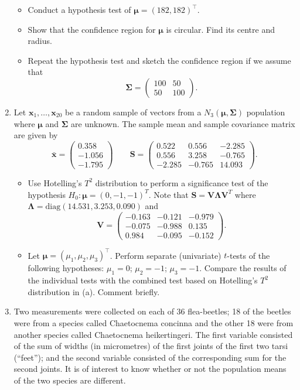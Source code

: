 \documentclass[]{book}
\providecommand{\tightlist}{%
  \setlength{\itemsep}{0pt}\setlength{\parskip}{0pt}}
\theoremstyle{definition}
\theoremstyle{definition}
\theoremstyle{definition}
\theoremstyle{remark}
\begin{document}
\begin{enumerate}
  \begin{itemize}
  \tightlist
  \item
    Conduct a hypothesis test of \({\boldsymbol{\mu}}= (182,182)^\top\).
  \item
    Show that the confidence region for \({\boldsymbol{\mu}}\) is circular. Find its centre and radius.
  \item
    Repeat the hypothesis test and sketch the confidence region if we assume that
    \[\boldsymbol{\Sigma}= \begin{pmatrix} 100 & 50 \\ 50 & 100 \end{pmatrix}.\]
  \end{itemize}
\item
  Let \(\mathbf x_1, \ldots, \mathbf x_{20}\) be a random sample of vectors from a \(N_3({\boldsymbol{\mu}},\boldsymbol{\Sigma})\) population where \({\boldsymbol{\mu}}\) and \(\boldsymbol{\Sigma}\) are unknown. The sample mean and sample covariance matrix are given by
  \[\bar{\mathbf x} = \begin{pmatrix} 0.358 \\ -1.056 \\ -1.795 \end{pmatrix} \qquad
  \mathbf S= \begin{pmatrix} 0.522 & 0.556 & -2.285 \\ 0.556 & 3.258 & -0.765 \\ -2.285 & -0.765 & 14.093 \end{pmatrix}.\]

  \begin{itemize}
  \tightlist
  \item
    Use Hotelling's \(T^2\) distribution to perform a significance test of the hypothesis \(H_0: {\boldsymbol{\mu}}= (0,-1,-1)^T\). Note that \(\mathbf S= \mathbf V\boldsymbol \Lambda\mathbf V^T\) where \(\boldsymbol \Lambda= \text{diag}(14.531, 3.253,0.090)\) and
    \[\mathbf V= \begin{pmatrix} -0.163 & -0.121 & -0.979 \\ -0.075 & -0.988 & 0.135 \\ 0.984 & -0.095 & -0.152 \end{pmatrix}.\]
  \item
    Let \({\boldsymbol{\mu}}= (\mu_1,\mu_2,\mu_3)^\top\). Perform separate (univariate) \(t\)-tests of the following hypotheses: \(\mu_1 = 0\); \(\mu_2 = -1\); \(\mu_3 = -1\). Compare the results of the individual tests with the combined test based on Hotelling's \(T^2\) distribution in (a). Comment briefly.
  \end{itemize}
\item
  Two measurements were collected on each of 36 flea-beetles; 18 of the beetles were from a species called Chaetocnema concinna and the other 18 were from another species called Chaetocnema heikertingeri. The first variable consisted of the sum of widths (in micrometres) of the first joints of the first two tarsi (``feet''); and the second variable consisted of the corresponding sum for the second joints. It is of interest to know
  whether or not the population means of the two species are different.


\end{enumerate}
\end{document}
